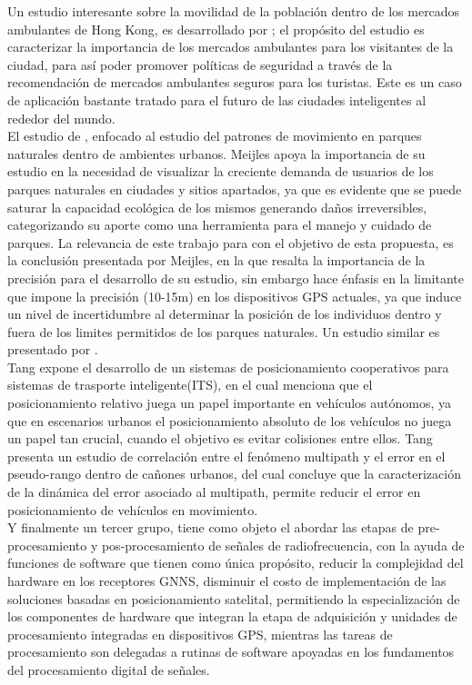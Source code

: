 Un estudio interesante sobre la movilidad de la población dentro de los mercados ambulantes de Hong Kong, es desarrollado por \cite{Tsang_2011}; el propósito del estudio es caracterizar la importancia de los mercados ambulantes para los visitantes de la ciudad, para así poder promover políticas de seguridad a través de la recomendación de mercados ambulantes seguros para los turistas. Este es un caso de aplicación bastante tratado para el futuro de las ciudades inteligentes al rededor del mundo.\\

El estudio de \cite{Meijles_2014}, enfocado al estudio del patrones de movimiento en parques naturales dentro de ambientes urbanos. Meijles apoya la importancia de su estudio en la necesidad de visualizar la creciente demanda de usuarios de los parques naturales en ciudades y sitios apartados, ya que es evidente que se puede saturar la capacidad ecológica de los mismos generando daños irreversibles, categorizando su aporte como una herramienta para el manejo y cuidado de parques. La relevancia de este trabajo para con el objetivo de esta propuesta, es la conclusión presentada por Meijles, en la que resalta la importancia de la precisión para el desarrollo de su estudio, sin embargo hace énfasis en la limitante que impone la precisión (10-15m) en los dispositivos GPS actuales, ya que induce un nivel de incertidumbre al determinar la posición de los individuos dentro y fuera de los limites permitidos de los parques naturales. Un estudio similar es presentado por \cite{Orellana_2012}.\\

Tang \cite{Tang_2014} expone el desarrollo de un sistemas de posicionamiento cooperativos para sistemas de trasporte inteligente(ITS), en el cual menciona que el posicionamiento relativo juega un papel importante en vehículos autónomos, ya que en escenarios urbanos el posicionamiento absoluto de los vehículos no juega un papel tan crucial, cuando el objetivo es evitar colisiones entre ellos. Tang presenta un estudio de correlación entre el fenómeno multipath y el error en el pseudo-rango dentro de cañones urbanos, del cual concluye que la caracterización de la dinámica del error asociado al multipath, permite reducir el error en posicionamiento de vehículos en movimiento.\\

Y finalmente un tercer grupo, tiene como objeto el abordar las etapas de pre-procesamiento y pos-procesamiento de señales de radiofrecuencia, con la ayuda de funciones de software que tienen como única propósito, reducir la complejidad del hardware en los receptores GNNS, disminuir el costo de implementación de las soluciones basadas en posicionamiento satelital, permitiendo la especialización de los componentes de hardware que integran la etapa de adquisición y unidades de procesamiento integradas en dispositivos GPS, mientras las tareas de procesamiento son delegadas a rutinas de software apoyadas en los fundamentos del procesamiento digital de señales.\\

